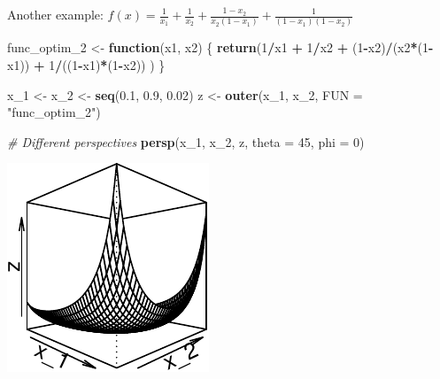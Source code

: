 \documentclass[11pt,]{article}
\newenvironment{Shaded}{\begin{snugshade}}{\end{snugshade}}
\newcommand{\KeywordTok}[1]{\textcolor[rgb]{0.13,0.29,0.53}{\textbf{#1}}}
\newcommand{\DataTypeTok}[1]{\textcolor[rgb]{0.13,0.29,0.53}{#1}}
\newcommand{\DecValTok}[1]{\textcolor[rgb]{0.00,0.00,0.81}{#1}}
\newcommand{\FloatTok}[1]{\textcolor[rgb]{0.00,0.00,0.81}{#1}}
\newcommand{\StringTok}[1]{\textcolor[rgb]{0.31,0.60,0.02}{#1}}
\newcommand{\CommentTok}[1]{\textcolor[rgb]{0.56,0.35,0.01}{\textit{#1}}}
\newcommand{\ControlFlowTok}[1]{\textcolor[rgb]{0.13,0.29,0.53}{\textbf{#1}}}
\newcommand{\OperatorTok}[1]{\textcolor[rgb]{0.81,0.36,0.00}{\textbf{#1}}}
\newcommand{\NormalTok}[1]{#1}
\begin{document}
Another example:
\(f(x) = \frac{1}{x_1}+\frac{1}{x_2}+\frac{1-x_2}{x_2(1-x_1)}+\frac{1}{(1-x_1)(1-x_2)}\)

\begin{Shaded}
\begin{Highlighting}[]
\NormalTok{func_optim_}\DecValTok{2}\NormalTok{ <-}\StringTok{ }\ControlFlowTok{function}\NormalTok{(x1, x2) }
\NormalTok{\{}
  \KeywordTok{return}\NormalTok{(}\DecValTok{1}\OperatorTok{/}\NormalTok{x1 }\OperatorTok{+}\StringTok{ }\DecValTok{1}\OperatorTok{/}\NormalTok{x2 }\OperatorTok{+}\StringTok{ }
\StringTok{    }\NormalTok{(}\DecValTok{1}\OperatorTok{-}\NormalTok{x2)}\OperatorTok{/}\NormalTok{(x2}\OperatorTok{*}\NormalTok{(}\DecValTok{1}\OperatorTok{-}\NormalTok{x1)) }\OperatorTok{+}\StringTok{ }
\StringTok{    }\DecValTok{1}\OperatorTok{/}\NormalTok{((}\DecValTok{1}\OperatorTok{-}\NormalTok{x1)}\OperatorTok{*}\NormalTok{(}\DecValTok{1}\OperatorTok{-}\NormalTok{x2))}
\NormalTok{    )}
\NormalTok{\}}

\NormalTok{x_}\DecValTok{1}\NormalTok{ <-}\StringTok{ }\NormalTok{x_}\DecValTok{2}\NormalTok{ <-}\StringTok{ }\KeywordTok{seq}\NormalTok{(}\FloatTok{0.1}\NormalTok{, }\FloatTok{0.9}\NormalTok{, }\FloatTok{0.02}\NormalTok{)}
\NormalTok{z <-}\StringTok{ }\KeywordTok{outer}\NormalTok{(x_}\DecValTok{1}\NormalTok{, x_}\DecValTok{2}\NormalTok{, }\DataTypeTok{FUN =} \StringTok{"func_optim_2"}\NormalTok{)}

\CommentTok{# Different perspectives}
\KeywordTok{persp}\NormalTok{(x_}\DecValTok{1}\NormalTok{, x_}\DecValTok{2}\NormalTok{, z, }\DataTypeTok{theta =} \DecValTok{45}\NormalTok{, }\DataTypeTok{phi =} \DecValTok{0}\NormalTok{) }
\end{Highlighting}
\end{Shaded}

\begin{center}\includegraphics{Optimization_files/figure-latex/opt_unconstr_optim_2-1} \end{center}
\end{document}
